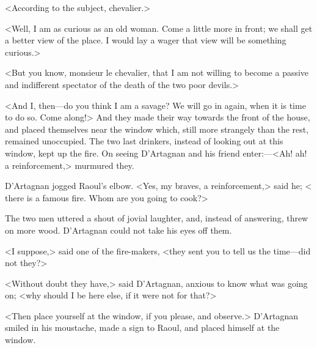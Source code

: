 <According to the subject, chevalier.>

<Well, I am as curious as an old woman. Come a little more in front; we shall get a better view of the place. I would lay a wager that view will be something curious.>

<But you know, monsieur le chevalier, that I am not willing to become a passive and indifferent spectator of the death of the two poor devils.>

<And I, then—do you think I am a savage? We will go in again, when it is time to do so. Come along!> And they made their way towards the front of the house, and placed themselves near the window which, still more strangely than the rest, remained unoccupied. The two last drinkers, instead of looking out at this window, kept up the fire. On seeing D'Artagnan and his friend enter:—<Ah! ah! a reinforcement,> murmured they.

D'Artagnan jogged Raoul's elbow. <Yes, my braves, a reinforcement,> said he; < there is a famous fire. Whom are you going to cook?>

The two men uttered a shout of jovial laughter, and, instead of answering, threw on more wood. D'Artagnan could not take his eyes off them.

<I suppose,> said one of the fire-makers, <they sent you to tell us the time—did not they?>

<Without doubt they have,> said D'Artagnan, anxious to know what was going on; <why should I be here else, if it were not for that?>

<Then place yourself at the window, if you please, and observe.> D'Artagnan smiled in his moustache, made a sign to Raoul, and placed himself at the window. 